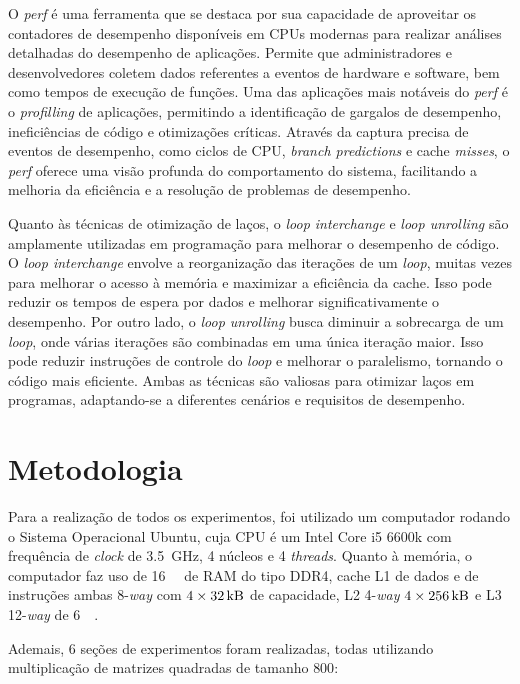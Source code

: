 \documentclass[12pt,a4paper]{article}
\begin{document}
O \textit{perf} é uma ferramenta que se destaca por sua capacidade de aproveitar os contadores de desempenho disponíveis em CPUs modernas para realizar análises detalhadas do desempenho de aplicações. Permite que administradores e desenvolvedores coletem dados referentes a eventos de hardware e software, bem como tempos de execução de funções. Uma das aplicações mais notáveis do \textit{perf} é o \textit{profilling} de aplicações, permitindo a identificação de gargalos de desempenho, ineficiências de código e otimizações críticas. Através da captura precisa de eventos de desempenho, como ciclos de CPU, \textit{branch predictions} e cache \textit{misses}, o \textit{perf} oferece uma visão profunda do comportamento do sistema, facilitando a melhoria da eficiência e a resolução de problemas de desempenho.

Quanto às técnicas de otimização de laços, o \textit{loop interchange} e \textit{loop unrolling} são amplamente utilizadas em programação para melhorar o desempenho de código. O \textit{loop interchange} envolve a reorganização das iterações de um \textit{loop}, muitas vezes para melhorar o acesso à memória e maximizar a eficiência da cache. Isso pode reduzir os tempos de espera por dados e melhorar significativamente o desempenho. Por outro lado, o \textit{loop unrolling} busca diminuir a sobrecarga de um \textit{loop}, onde várias iterações são combinadas em uma única iteração maior. Isso pode reduzir instruções de controle do \textit{loop} e melhorar o paralelismo, tornando o código mais eficiente. Ambas as técnicas são valiosas para otimizar laços em programas, adaptando-se a diferentes cenários e requisitos de desempenho.

\section{Metodologia}

Para a realização de todos os experimentos, foi utilizado um computador rodando o Sistema Operacional Ubuntu, cuja CPU é um Intel Core i5 6600k com frequência de \textit{clock} de \SI{3,5}{\giga\hertz}, 4 núcleos e 4 \textit{threads}. Quanto à memória, o computador faz uso de \SI{16}{\giga\byte} de RAM do tipo DDR4, cache L1 de dados e de instruções ambas 8-\textit{way} com $4 \times \SI{32}{\kilo\byte}$ de capacidade, L2 4-\textit{way} $4 \times \SI{256}{\kilo\byte}$ e L3 12-\textit{way} de \SI{6}{\mega\byte}. 

Ademais, 6 seções de experimentos foram realizadas, todas utilizando multiplicação de matrizes quadradas de tamanho $800$:
\end{document}
